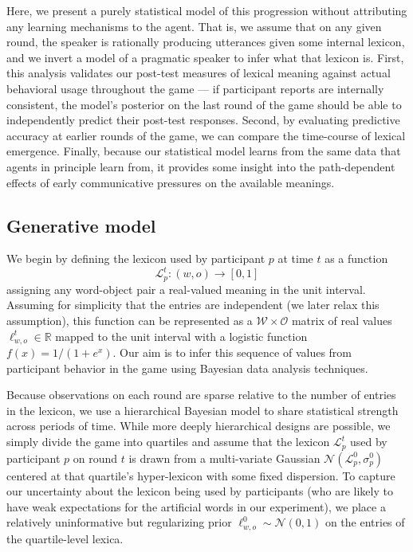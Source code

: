 \documentclass[10pt,letterpaper]{article}
\begin{document}
Here, we present a purely statistical model of this progression without attributing any learning mechanisms to the agent. That is, we assume that on any given round, the speaker is rationally producing utterances given some internal lexicon, and we invert a model of a pragmatic speaker to infer what that lexicon is. First, this analysis validates our post-test measures of lexical meaning against actual behavioral usage throughout the game --- if participant reports are internally consistent, the model's posterior on the last round of the game should be able to independently predict their post-test responses. Second, by evaluating predictive accuracy at earlier rounds of the game, we can compare the time-course of lexical emergence. Finally, because our statistical model learns from the same data that agents in principle learn from, it provides some insight into the path-dependent effects of early communicative pressures on the available meanings. %

\subsection{Generative model}

We begin by defining the lexicon used by participant $p$ at time $t$ as a function 
$$\mathcal{L}_p^{t} : (w, o) \rightarrow [0,1]$$ 
assigning any word-object pair a real-valued meaning in the unit interval. Assuming for simplicity that the entries are independent (we later relax this assumption), this function can be represented as a $\mathcal{W} \times \mathcal{O}$ matrix of real values $\ell_{w,o}^t \in \mathbb{R}$ mapped to the unit interval with a logistic function $f(x) = 1/(1 + e^{x})$. Our aim is to infer this sequence of values from participant behavior in the game using Bayesian data analysis techniques. 

Because observations on each round are sparse relative to the number of entries in the lexicon, we use a hierarchical Bayesian model to share statistical strength across periods of time. While more deeply hierarchical designs are possible, we simply divide the game into quartiles and assume that the lexicon $\mathcal{L}^t_p$ used by participant $p$ on round $t$ is drawn from a multi-variate Gaussian $\mathcal{N}(\mathcal{L}^{0}_p, \sigma_p^{0})$ centered at that quartile's hyper-lexicon with some fixed dispersion. To capture our uncertainty about the lexicon being used by participants (who are likely to have weak expectations for the artificial words in our experiment), we place a relatively uninformative but regularizing prior $\ell_{w,o}^0 \sim \mathcal{N}(0, 1)$ on the entries of the quartile-level lexica. 
\end{document}
